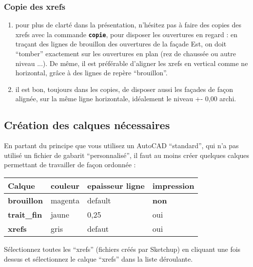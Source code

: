 \documentclass[a4paper,12pt,french]{sphinxmanual}
\begin{document}
\subsubsection{Copie des xrefs}
\label{init_su+acad/004_acad1:copie-des-xrefs}
\noindent{}
\begin{enumerate}
\item {} 
pour plus de clarté dans la présentation, n'hésitez pas à faire des copies des xrefs avec la commande \textbf{\texttt{copie}}, pour disposer les ouvertures en regard : en traçant des lignes de brouillon des ouvertures de la façade Est, on doit ``tomber'' exactement sur les ouvertures en plan (rez de chaussée ou autre niveau ...). De même, il est préférable d'aligner les xrefs en vertical comme ne horizontal, grâce à des lignes de repère ``brouillon''.

\item {} 
il est bon, toujours dans les copies, de disposer aussi les façades de façon alignée, sur la même ligne horizontale, idéalement le niveau +- 0,00 archi.

\end{enumerate}


\subsection{Création des calques nécessaires}
\label{init_su+acad/004_acad1:creation-des-calques-necessaires}
En partant du principe que vous utilisez un AutoCAD ``standard'', qui n'a pas utilisé un fichier de gabarit ``personnalisé'', il faut au moins créer quelques calques permettant de travailler de façon ordonnée :

\noindent\begin{tabulary}{\linewidth}{|L|L|L|L|}
\hline

\textbf{Calque}
&
\textbf{couleur}
&
\textbf{epaisseur ligne}
&
\textbf{impression}
\\
\hline
\textbf{brouillon}
&
magenta
&
default
&
\textbf{non}
\\
\hline
\textbf{trait\_fin}
&
jaune
&
0,25
&
oui
\\
\hline
\textbf{xrefs}
&
gris
&
defaut
&
oui
\\
\hline\end{tabulary}


Sélectionnez toutes les ``xrefs'' (fichiers  créés par Sketchup) en cliquant une fois dessus et sélectionnez le calque ``xrefs'' dans la liste déroulante.
\end{document}
